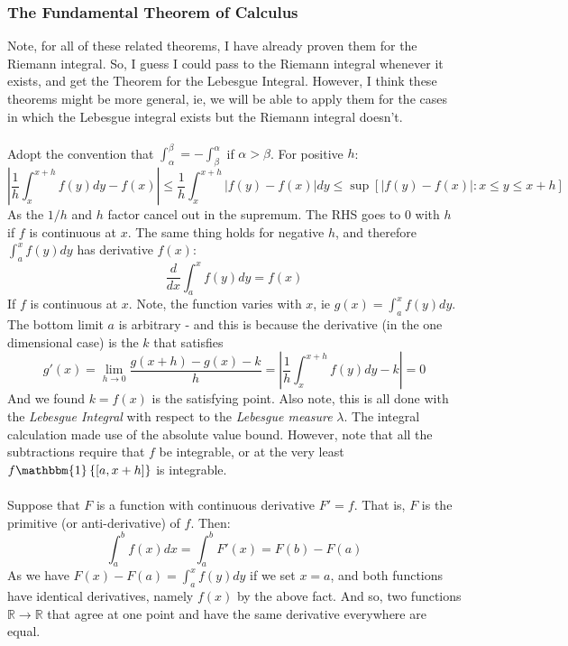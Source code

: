 \documentclass[12pt,a4paper]{article}
\newcommand{\1}[1]{\mathbbm{1}\left\{ #1 \right\}}
\newcommand{\R}{\mathbb{R}}
\begin{document}
\subsubsection{The Fundamental Theorem of Calculus}
Note, for all of these related theorems, I have already proven them for the Riemann integral. So, I guess I could pass to the Riemann integral whenever it exists, and get the Theorem for the Lebesgue Integral. However, I think these theorems might be more general, ie, we will be able to apply them for the cases in which the Lebesgue integral exists but the Riemann integral doesn't.
\\\\
Adopt the convention that $\int_\alpha^\beta = -\int_\beta^\alpha$ if $\alpha > \beta$. For positive $h$:
$$
	\left|\frac{1}{h}\int_x^{x+h} f(y) dy - f(x)\right| \leq
	\frac{1}{h}\int_x^{x+h} |f(y) - f(x)| dy \leq
	\sup\left[|f(y) - f(x)| : x \leq y \leq x + h\right]
$$
As the $1/h$ and $h$ factor cancel out in the supremum. The RHS goes to 0 with $h$ if $f$ is continuous at $x$. The same thing holds for negative $h$, and therefore $\int_a^x f(y) dy$ has derivative $f(x)$:
$$
	\frac{d}{dx} \int_a^x f(y)dy = f(x)
$$
If $f$ is continuous at $x$. Note, the function varies with $x$, ie $g(x) = \int_a^x f(y) dy$. The bottom limit $a$ is arbitrary - and this is because the derivative (in the one dimensional case) is the $k$ that satisfies
$$
	g'(x) = \lim_{h \to 0} \frac{g(x + h) - g(x) - k}{h} =
	\left|\frac{1}{h}\int_x^{x+h} f(y) dy - k\right| = 0
$$
And we found $k = f(x)$ is the satisfying point. Also note, this is all done with the \textit{Lebesgue Integral} with respect to the \textit{Lebesgue measure} $\lambda$. The integral calculation made use of the absolute value bound. However, note that all the subtractions require that $f$ be integrable, or at the very least $f\1{[a,x+h]}$ is integrable.
\\\\
Suppose that $F$ is a function with continuous derivative $F' = f$. That is, $F$ is the primitive (or anti-derivative) of $f$. Then:
$$
	\int_a^b f(x) dx = \int_a^b F'(x) = F(b) - F(a)
$$
As we have $F(x) - F(a) = \int_a^x f(y) dy$ if we set $x = a$, and both functions have identical derivatives, namely $f(x)$ by the above fact. And so, two functions $\R \to \R$ that agree at one point and have the same derivative everywhere are equal.
\end{document}
